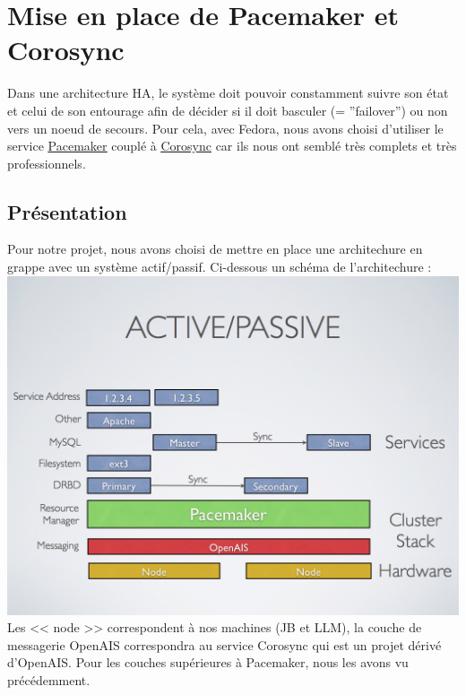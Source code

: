 \documentclass[11pt,a4paper]{report}
\begin{document}
        \section{Mise en place de Pacemaker et Corosync}
            
            Dans une architecture HA, le syst\`eme doit pouvoir constamment suivre son \'etat et celui de son entourage afin de d\'ecider si il doit basculer (= ''failover'') ou non vers un noeud de secours. Pour cela, avec Fedora, nous avons choisi d'utiliser le service \underline{\href{http://clusterlabs.org}{Pacemaker}} coupl\'e \`a \underline{\href{http://www.corosync.org}{Corosync}} car ils nous ont sembl\'e tr\`es complets et tr\`es professionnels.
            
            \subsection{Pr\'esentation}
                
                Pour notre projet, nous avons choisi de mettre en place une architechure en grappe avec un syst\`eme actif/passif. Ci-dessous un sch\'ema de l'architechure :\\
                
                \includegraphics[keepaspectratio=true, width=\textwidth]{content/pacemaker-active-passive.png}\\[1cm]
                
                Les << node >> correspondent \`a nos machines (JB et LLM), la couche de messagerie OpenAIS correspondra au service Corosync qui est un projet d\'eriv\'e d'OpenAIS. Pour les couches sup\'erieures \`a Pacemaker, nous les avons vu pr\'ec\'edemment.\\
                
\end{document}
